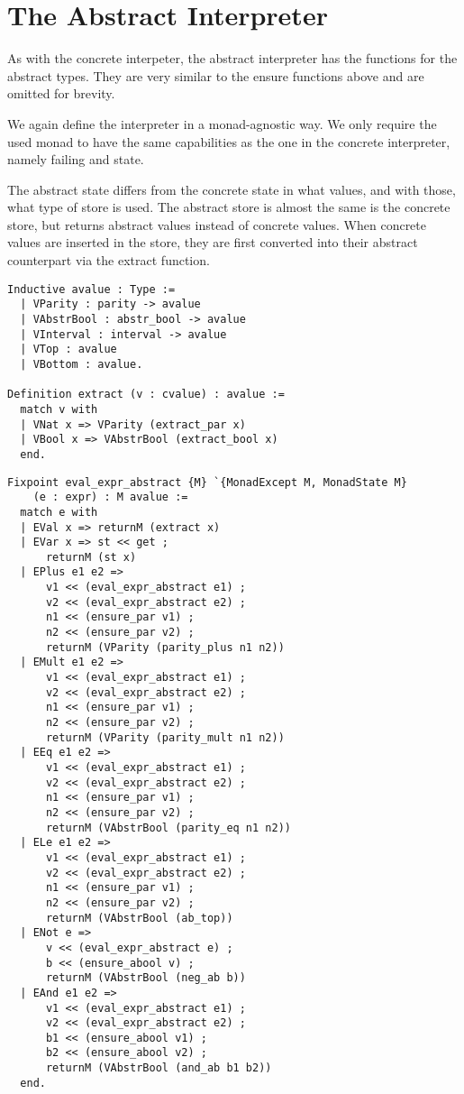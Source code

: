 \section{The Abstract Interpreter}
As with the concrete interpeter, the abstract interpreter has the
 functions for the abstract types. 
They are very similar to the ensure functions above and are omitted for brevity. 

We again define the interpreter in a monad-agnostic way. We only require the
used monad to have the same capabilities as the one in the concrete
interpreter, namely failing and state.

The abstract state differs from the concrete state in what values, and with
those, what type of store is
used. The abstract store is almost the same is the concrete store, but returns
abstract values instead of concrete values. When concrete values are inserted
in the store, they are first converted into their abstract counterpart via the
extract function.

\begin{listing}[H]
\begin{verbatim}
Inductive avalue : Type :=
  | VParity : parity -> avalue
  | VAbstrBool : abstr_bool -> avalue
  | VInterval : interval -> avalue
  | VTop : avalue
  | VBottom : avalue.

Definition extract (v : cvalue) : avalue :=
  match v with
  | VNat x => VParity (extract_par x)
  | VBool x => VAbstrBool (extract_bool x)
  end.
\end{verbatim}
\end{listing}

\begin{listing}[H]
\begin{verbatim}
Fixpoint eval_expr_abstract {M} `{MonadExcept M, MonadState M} 
    (e : expr) : M avalue :=
  match e with
  | EVal x => returnM (extract x)
  | EVar x => st << get ;
      returnM (st x)
  | EPlus e1 e2 => 
      v1 << (eval_expr_abstract e1) ;
      v2 << (eval_expr_abstract e2) ;
      n1 << (ensure_par v1) ;
      n2 << (ensure_par v2) ;
      returnM (VParity (parity_plus n1 n2))
  | EMult e1 e2 =>
      v1 << (eval_expr_abstract e1) ;
      v2 << (eval_expr_abstract e2) ;
      n1 << (ensure_par v1) ;
      n2 << (ensure_par v2) ;
      returnM (VParity (parity_mult n1 n2))
  | EEq e1 e2 =>
      v1 << (eval_expr_abstract e1) ;
      v2 << (eval_expr_abstract e2) ;
      n1 << (ensure_par v1) ;
      n2 << (ensure_par v2) ;
      returnM (VAbstrBool (parity_eq n1 n2))
  | ELe e1 e2 =>
      v1 << (eval_expr_abstract e1) ;
      v2 << (eval_expr_abstract e2) ;
      n1 << (ensure_par v1) ;
      n2 << (ensure_par v2) ;
      returnM (VAbstrBool (ab_top))
  | ENot e =>
      v << (eval_expr_abstract e) ;
      b << (ensure_abool v) ;
      returnM (VAbstrBool (neg_ab b))
  | EAnd e1 e2 =>
      v1 << (eval_expr_abstract e1) ;
      v2 << (eval_expr_abstract e2) ;
      b1 << (ensure_abool v1) ;
      b2 << (ensure_abool v2) ;
      returnM (VAbstrBool (and_ab b1 b2))
  end.
\end{verbatim}
\end{listing}

